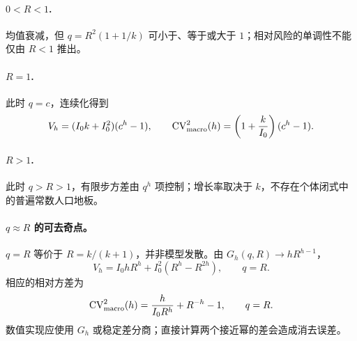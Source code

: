 \documentclass[11pt,a4paper]{article}
\theoremstyle{remark}
\begin{document}
\paragraph{$0<R<1$.} 均值衰减，但 $q=R^2(1+1/k)$ 可小于、等于或大于 $1$；相对风险的单调性不能仅由 $R<1$ 推出。

\paragraph{$R=1$.} 此时 $q=c$，连续化得到
\begin{equation}
V_h=(I_0k+I_0^2)(c^h-1),\qquad
\operatorname{CV}_{\rm macro}^2(h)=\left(1+\frac{k}{I_0}\right)(c^h-1).\label{eq:macro_critical}
\end{equation}

\paragraph{$R>1$.} 此时 $q>R>1$，有限步方差由 $q^h$ 项控制；增长率取决于 $k$，不存在个体闭式中的普遍常数人口地板。

\paragraph{$q\approx R$ 的可去奇点。} $q=R$ 等价于 $R=k/(k+1)$，并非模型发散。由 $G_h(q,R)\to hR^{h-1}$，
\begin{equation}
V_h=I_0hR^h+I_0^2(R^h-R^{2h}),\qquad q=R.\label{eq:q_equal_R}
\end{equation}
相应的相对方差为
\begin{equation}
\operatorname{CV}_{\rm macro}^2(h)
=\frac{h}{I_0R^h}+R^{-h}-1,\qquad q=R.
\label{eq:q_equal_R_cv}
\end{equation}
数值实现应使用 $G_h$ 或稳定差分商；直接计算两个接近幂的差会造成消去误差。
\end{document}
